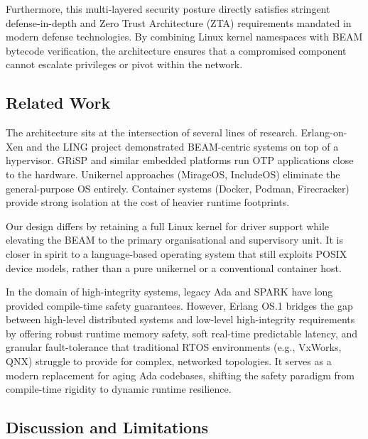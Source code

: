 \documentclass{article}
\begin{document}
Furthermore, this multi-layered security posture directly satisfies stringent defense-in-depth and Zero Trust Architecture (ZTA) requirements mandated in modern defense technologies. By combining Linux kernel namespaces with BEAM bytecode verification, the architecture ensures that a compromised component cannot escalate privileges or pivot within the network.

\subsection{Related Work}

The architecture sits at the intersection of several lines of research.
Erlang-on-Xen and the LING project demonstrated BEAM-centric systems on top of a hypervisor.
GRiSP and similar embedded platforms run OTP applications close to the hardware.
Unikernel approaches (MirageOS, IncludeOS) eliminate the general-purpose OS entirely.
Container systems (Docker, Podman, Firecracker) provide strong isolation at the cost of heavier runtime footprints.

Our design differs by retaining a full Linux kernel for driver support while elevating the BEAM to the primary organisational and supervisory unit.
It is closer in spirit to a language-based operating system that still exploits POSIX device models, rather than a pure unikernel or a conventional container host.

In the domain of high-integrity systems, legacy Ada and SPARK have long provided compile-time safety guarantees. However, Erlang OS.1 bridges the gap between high-level distributed systems and low-level high-integrity requirements by offering robust runtime memory safety, soft real-time predictable latency, and granular fault-tolerance that traditional RTOS environments (e.g., VxWorks, QNX) struggle to provide for complex, networked topologies. It serves as a modern replacement for aging Ada codebases, shifting the safety paradigm from compile-time rigidity to dynamic runtime resilience.

\subsection{Discussion and Limitations}
\end{document}
